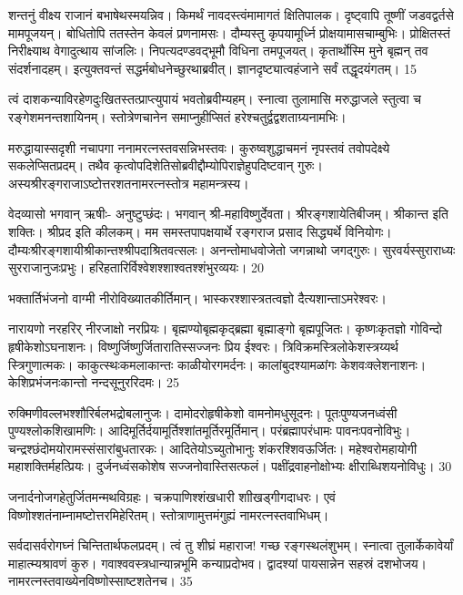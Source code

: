 शन्तनुं वीक्ष्य राजानं बभाषेथस्मयन्निव।
किमर्थं नावदस्त्वंमामागतं क्षितिपालक।
दृष्ट्वापि तूष्णीं जडवद्वर्तसे मामपूजयन्।
बोधितोपि ततस्तेन केवलं प्रणनामसः।
दौम्यस्तु कृपयामूर्ध्नि प्रोक्षयामासचाम्बुभिः।
प्रोक्षितस्तं निरीक्ष्याथ वेगादुत्थाय सांजलिः।
निपत्यदण्डवद्भूमौ विधिना तमपूजयत्।
कृतार्थोस्मि मुने बृह्मन् तव संदर्शनादहम्।
इत्युक्तवन्तं सद्धर्मबोधनेच्छुरथाब्रवीत्।
ज्ञानदृष्ट्यात्वहंजाने सर्वं तद्धृदयंगतम्।
15

त्वं दाशकन्याविरहेणदुःखितस्तत्प्राप्त्युपायं भवतोब्रवीम्यहम्।
स्नात्वा तुलामासि मरुद्धाजले स्तुत्वा च रङ्गेशमनन्तशायिनम्।
स्तोत्रेणचानेन समाप्नुहीप्सितं हरेश्चतुर्द्वद्वशताग्र्यनामभिः।

मरुद्धायास्सदृशी नचापगा ननामरत्नस्तवसन्निभस्तवः।
कुरुष्वशुद्धाचमनं नृपस्तवं तवोपदेक्ष्ये सकलेप्सितप्रदम्।
तथैव कृत्वोपदिशेतिसोब्रवीद्दौम्योपिराज्ञेहुपदिष्टवान्
गुरुः।
अस्यश्रीरङ्गराजाऽष्टोत्तरशतनामरत्नस्तोत्र
महामन्त्रस्य।

वेदव्यासो भगवान् ऋषीः- अनुष्टुप्छंदः।
भगवान् श्री-महाविष्णुर्देवता।
श्रीरङ्गशायेतिबीजम्।
श्रीकान्त इति शक्तिः।
श्रीप्रद इति कीलकम्।
मम समस्तपापक्षयार्थे रङ्गराज प्रसाद सिद्ध्यर्थे विनियोगः।
दौम्यःश्रीरङ्गशायीश्रीकान्तश्श्रीपदाश्रितवत्सलः।
अनन्तोमाधवोजेतो जगन्नाथो जगद्गुरुः।
सुरवर्यस्सुराराध्यः सुरराजानुजःप्रभुः।
हरिहतारिर्विश्वेशश्शाश्वतश्शंभुरव्ययः।
20

भक्तार्तिभंजनो वाग्मी नीरोविख्यातकीर्तिमान्।
भास्करश्शास्त्रतत्वज्ञो दैत्यशान्ताऽमरेश्वरः।

नारायणो नरहरिर् नीरजाक्षो नरप्रियः।
बृह्मण्योबृह्मकृद्ब्रह्मा बृह्माङ्गो बृह्मपूजितः।
कृष्णःकृतज्ञो गोविन्दो हृषीकेशोऽघनाशनः।
विष्णुर्जिष्णुर्जितारातिस्सज्जनः प्रिय ईश्वरः।
त्रिविक्रमस्त्रिलोकेशस्त्रय्यर्थ स्त्रिगुणात्मकः।
काकुत्स्थःकमलाकान्तः काळीयोरगमर्दनः।
कालांबुदश्यामळांगः केशवःक्लेशनाशनः।
केशिप्रभंजनःकान्तो नन्दसूनुररिदमः।
25

रुक्मिणीवल्लभश्शौरिर्बलभद्रोबलानुजः।
दामोदरोहृषीकेशो वामनोमधुसूदनः।
पूतःपुण्यजनध्वंसी पुण्यश्लोकशिखामणिः।
आदिमूर्तिर्दयामूर्तिश्शांतमूर्तिरमूर्तिमान्।
परंब्रह्मापरंधामः पावनःपवनोविभुः।
चन्द्रश्छंदोमयोरामस्संसारांबुधतारकः।
आदितेयोऽच्युतोभानुः शंकरश्शिवऊर्जितः।
महेश्वरोमहायोगी महाशक्तिर्महत्प्रियः।
दुर्जनध्वंसकोशेष सज्जनोवास्तिसत्फलं।
पक्षींद्रवाहनोक्षोभ्यः क्षीराब्धिशयनोविधुः।
30

जनार्दनोजगहेतुर्जितमन्मथविग्रहः।
चक्रपाणिश्शंखधारी शाीखड्गीगदाधरः।
एवं विष्णोश्शतंनाम्नामष्टोत्तरमिहेरितम्।
स्तोत्राणामुत्तमंगुह्यं नामरत्नस्तवाभिधम्।

सर्वदासर्वरोगघ्नं चिन्तितार्थफलप्रदम्।
त्वं तु शीघ्रं महाराज! गच्छ रङ्गस्थलंशुभम्।
स्नात्वा तुलार्केकावेर्यां माहात्म्यश्रावणं कुरु।
गवाश्ववस्त्रधान्यान्नभूमि कन्याप्रदोभव।
द्वादश्यां पायसान्नेन सहस्रं दशभोजय।
नामरत्नस्तवाख्येनविष्णोस्साष्टशतेनच।
35

